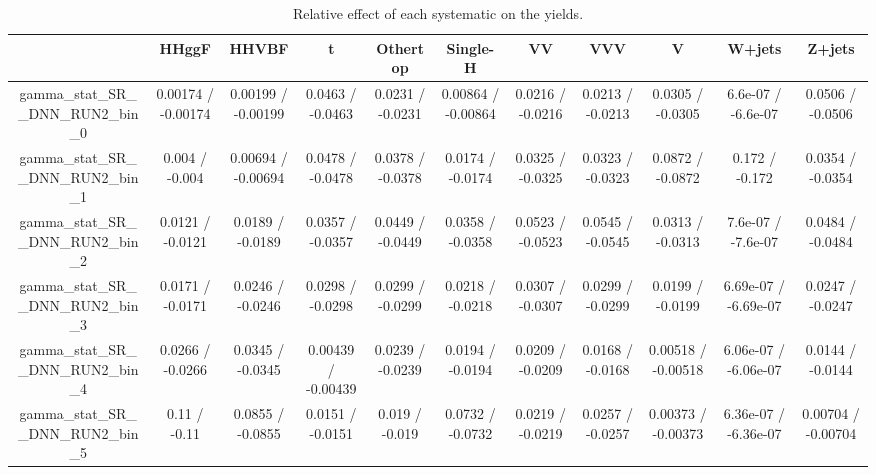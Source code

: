 \documentclass[10pt]{article}
\begin{document}
\begin{table}[htbp]
\begin{center}
\begin{tabular}{|c|c|c|c|c|c|c|c|c|c|c|}
\hline 
      & HHggF      & HHVBF      & t      & Othertop      & Single-H      & VV      & VVV      & V      & W+jets      & Z+jets \\ 
\hline 
  gamma_stat_SR__DNN_RUN2_bin_0 & 0.00174 / -0.00174 & 0.00199 / -0.00199 & 0.0463 / -0.0463 & 0.0231 / -0.0231 & 0.00864 / -0.00864 & 0.0216 / -0.0216 & 0.0213 / -0.0213 & 0.0305 / -0.0305 & 6.6e-07 / -6.6e-07 & 0.0506 / -0.0506 \\ 
  gamma_stat_SR__DNN_RUN2_bin_1 & 0.004 / -0.004 & 0.00694 / -0.00694 & 0.0478 / -0.0478 & 0.0378 / -0.0378 & 0.0174 / -0.0174 & 0.0325 / -0.0325 & 0.0323 / -0.0323 & 0.0872 / -0.0872 & 0.172 / -0.172 & 0.0354 / -0.0354 \\ 
  gamma_stat_SR__DNN_RUN2_bin_2 & 0.0121 / -0.0121 & 0.0189 / -0.0189 & 0.0357 / -0.0357 & 0.0449 / -0.0449 & 0.0358 / -0.0358 & 0.0523 / -0.0523 & 0.0545 / -0.0545 & 0.0313 / -0.0313 & 7.6e-07 / -7.6e-07 & 0.0484 / -0.0484 \\ 
  gamma_stat_SR__DNN_RUN2_bin_3 & 0.0171 / -0.0171 & 0.0246 / -0.0246 & 0.0298 / -0.0298 & 0.0299 / -0.0299 & 0.0218 / -0.0218 & 0.0307 / -0.0307 & 0.0299 / -0.0299 & 0.0199 / -0.0199 & 6.69e-07 / -6.69e-07 & 0.0247 / -0.0247 \\ 
  gamma_stat_SR__DNN_RUN2_bin_4 & 0.0266 / -0.0266 & 0.0345 / -0.0345 & 0.00439 / -0.00439 & 0.0239 / -0.0239 & 0.0194 / -0.0194 & 0.0209 / -0.0209 & 0.0168 / -0.0168 & 0.00518 / -0.00518 & 6.06e-07 / -6.06e-07 & 0.0144 / -0.0144 \\ 
  gamma_stat_SR__DNN_RUN2_bin_5 & 0.11 / -0.11 & 0.0855 / -0.0855 & 0.0151 / -0.0151 & 0.019 / -0.019 & 0.0732 / -0.0732 & 0.0219 / -0.0219 & 0.0257 / -0.0257 & 0.00373 / -0.00373 & 6.36e-07 / -6.36e-07 & 0.00704 / -0.00704 \\ 
\hline 
\end{tabular} 
\caption{Relative effect of each systematic on the yields.} 
\end{center} 
\end{table} 
\end{document}
